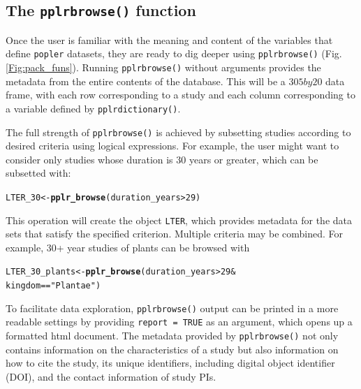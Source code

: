 \documentclass{article}\usepackage[]{graphicx}\usepackage[]{color}
\makeatletter
\newcommand{\hlnum}[1]{\textcolor[rgb]{0.686,0.059,0.569}{#1}}%
\newcommand{\hlstr}[1]{\textcolor[rgb]{0.192,0.494,0.8}{#1}}%
\newcommand{\hlopt}[1]{\textcolor[rgb]{0,0,0}{#1}}%
\newcommand{\hlstd}[1]{\textcolor[rgb]{0.345,0.345,0.345}{#1}}%
\newcommand{\hlkwb}[1]{\textcolor[rgb]{0.69,0.353,0.396}{#1}}%
\newcommand{\hlkwd}[1]{\textcolor[rgb]{0.737,0.353,0.396}{\textbf{#1}}}%
\newenvironment{kframe}{%
 \def\at@end@of@kframe{}%
 \ifinner\ifhmode%
  \def\at@end@of@kframe{\end{minipage}}%
  \begin{minipage}{\columnwidth}%
 \fi\fi%
 \def\FrameCommand##1{\hskip\@totalleftmargin \hskip-\fboxsep
 \colorbox{shadecolor}{##1}\hskip-\fboxsep
     \hskip-\linewidth \hskip-\@totalleftmargin \hskip\columnwidth}%
 \MakeFramed {\advance\hsize-\width
   \@totalleftmargin\z@ \linewidth\hsize
   \@setminipage}}%
 {\par\unskip\endMakeFramed%
 \at@end@of@kframe}
\newenvironment{knitrout}{}{} %
\makeatother
\begin{document}
\subsection*{The \texttt{pplr\textunderscore browse()} function}
Once the user is familiar with the meaning and content of the variables that define \texttt{popler} datasets, they are ready to dig deeper using \texttt{pplr\textunderscore browse()} (Fig. \ref{Fig:pack_funs}). Running \texttt{pplr\textunderscore browse()} without arguments provides the metadata from the entire contents of the database. This will be a $305 by 20$ data frame, with each row corresponding to a study and each column corresponding to a variable defined by \texttt{pplr\textunderscore dictionary()}.

The full strength of \texttt{pplr\textunderscore browse()} is achieved by subsetting studies according to desired criteria using logical expressions. For example, the user might want to consider only studies whose duration is 30 years or greater, which can be subsetted with:
\begin{knitrout}
\color{fgcolor}\begin{kframe}
\begin{alltt}
\hlstd{LTER_30} \hlkwb{<-} \hlkwd{pplr_browse}\hlstd{( duration_years} \hlopt{>} \hlnum{29}\hlstd{)}
\end{alltt}
\end{kframe}
\end{knitrout}
This operation will create the object \texttt{LTER}, which provides metadata for the data sets that satisfy the specified criterion. Multiple criteria may be combined. For example, 30+ year studies of plants can be browsed with
\begin{knitrout}
\color{fgcolor}\begin{kframe}
\begin{alltt}
\hlstd{LTER_30_plants} \hlkwb{<-} \hlkwd{pplr_browse}\hlstd{( duration_years} \hlopt{>} \hlnum{29} \hlopt{&}
                               \hlstd{kingdom} \hlopt{==} \hlstr{"Plantae"}\hlstd{)}
\end{alltt}
\end{kframe}
\end{knitrout}
To facilitate data exploration, \texttt{pplr\textunderscore browse()} output can be printed in a more readable settings by providing \texttt{report = TRUE} as an argument, which opens up a formatted html document. The metadata provided by \texttt{pplr\textunderscore browse()} not only contains information on the characteristics of a study but also information on how to cite the study, its unique identifiers, including digital object identifier (DOI), and the contact information of study PIs. 
\end{document}
